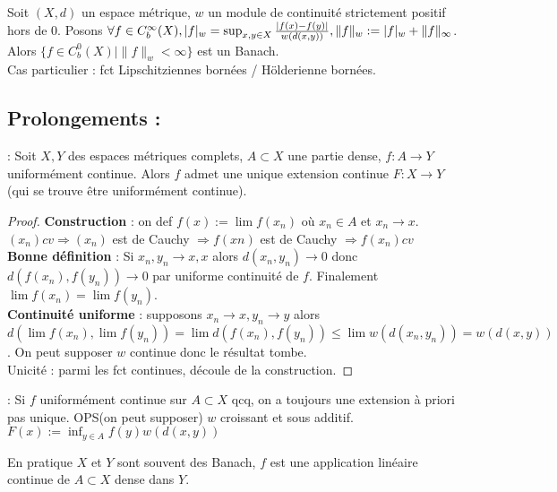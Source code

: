 \begin{ex}
    Soit $(X,d)$ un espace métrique, $w$ un module de continuité strictement positif hors de 0. Posons $\forall f\in C^\infty _b(X),\\ |f|_w=\sup_{x,y\in X}\frac{|f(x)-f(y)|}{w(d(x,y))},\|f\|_w:=|f|_w+\|f\|_\infty $. \\
    Alors $\{f\in C^0_b(X)|\|f\|_w<\infty \} $ est un Banach.\\
    Cas particulier : fct Lipschitziennes bornées / Hölderienne bornées.
\end{ex}

\subsection{Prolongements :}
\begin{propriete} : Soit $X,Y$ des espaces métriques complets, $A\subset X$ une partie dense, $f:A\to Y$ uniformément continue. Alors $f$ admet une unique extension continue $F:X\to Y$ (qui se trouve être uniformément continue).
\end{propriete}
\begin{proof}
    \textbf{Construction} : on def $f(x):=\lim f(x_n)$ où $x_{n}\in A$ et $x_{n}\to x$. $(x_{n})cv\Rightarrow (x_{n})$ est de Cauchy $\Rightarrow f(xn)$ est de Cauchy $\Rightarrow f(x_{n})cv$ \\
    \textbf{Bonne définition} : Si $x_{n},y_n \to x,x$ alors $d(x_{n},y_n)\to 0$ donc \\$d(f(x_{n}),f(y_n))\to 0$ par uniforme continuité de $f$. Finalement \\$\lim f(x_{n})=\lim f(y_n).$ \\
\textbf{Continuité uniforme} : supposons $x_{n}\to x, y_n\to y$ alors $d(\lim f(x_{n}), \lim f(y_n))=\lim d(f(x_{n}),f(y_n))\le \lim w(d(x_{n},y_n))=w(d(x,y))$. On peut supposer $w$ continue donc le résultat tombe.\\
    Unicité : parmi les fct continues, découle de la construction.
\end{proof}
\begin{remarque}  : Si $f$ uniformément continue sur $A\subset X$ qcq, on a toujours une extension à priori pas unique. OPS(on peut supposer) $w$ croissant et sous additif. $F(x):=\inf_{y\in A}f(y)w(d(x,y))$
\end{remarque}
\begin{remarque}
    En pratique $X$ et $Y$ sont souvent des Banach, $f$ est une application linéaire continue de $A\subset X$ dense dans $Y$.
\end{remarque}
